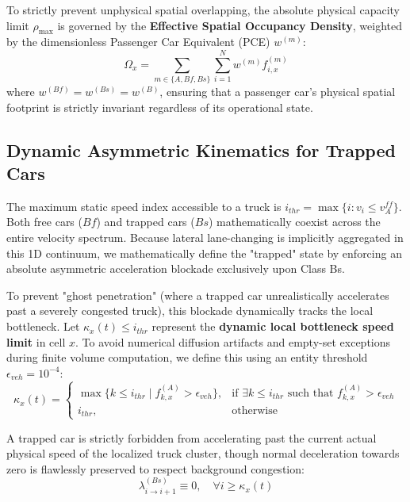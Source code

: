 \documentclass[11pt,a4paper]{article}
\begin{document}
To strictly prevent unphysical spatial overlapping, the absolute physical capacity limit $\rho_{\max}$ is governed by the \textbf{Effective Spatial Occupancy Density}, weighted by the dimensionless Passenger Car Equivalent (PCE) $w^{(m)}$:
\begin{equation}
\Omega_{x} = \sum_{m\in\{A,Bf,Bs\}}\sum_{i=1}^{N} w^{(m)} f_{i,x}^{(m)}
\end{equation}
where $w^{(Bf)} = w^{(Bs)} = w^{(B)}$, ensuring that a passenger car's physical spatial footprint is strictly invariant regardless of its operational state.

\subsection{Dynamic Asymmetric Kinematics for Trapped Cars}
The maximum static speed index accessible to a truck is $i_{thr} = \max\{i : v_i \le v_A^{ff}\}$. Both free cars ($Bf$) and trapped cars ($Bs$) mathematically coexist across the entire velocity spectrum. Because lateral lane-changing is implicitly aggregated in this 1D continuum, we mathematically define the "trapped" state by enforcing an absolute asymmetric acceleration blockade exclusively upon Class Bs.

To prevent "ghost penetration" (where a trapped car unrealistically accelerates past a severely congested truck), this blockade dynamically tracks the local bottleneck. Let $\kappa_x(t) \le i_{thr}$ represent the \textbf{dynamic local bottleneck speed limit} in cell $x$. To avoid numerical diffusion artifacts and empty-set exceptions during finite volume computation, we define this using an entity threshold $\epsilon_{veh} = 10^{-4}$:
\begin{equation}
\kappa_x(t) =
\begin{cases}
\max\{k \le i_{thr} \mid f_{k,x}^{(A)} > \epsilon_{veh}\}, & \text{if } \exists k \le i_{thr} \text{ such that } f_{k,x}^{(A)} > \epsilon_{veh} \\
i_{thr}, & \text{otherwise}
\end{cases}
\end{equation}

A trapped car is strictly forbidden from accelerating past the current actual physical speed of the localized truck cluster, though normal deceleration towards zero is flawlessly preserved to respect background congestion:
\begin{equation}
\lambda_{i\rightarrow i+1}^{(Bs)} \equiv 0, \quad \forall i \ge \kappa_x(t)
\end{equation}
\end{document}
